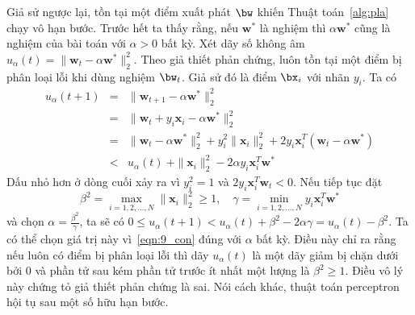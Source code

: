 Giả sử ngược lại, tồn tại một điểm xuất phát $\bw$ khiến Thuật
toán~\ref{alg:pla} chạy vô hạn bước. Trước hết ta thấy rằng, nếu $\mathbf{w}^*$ là nghiệm thì $\alpha\mathbf{w}^*$ cũng là nghiệm của
bài toán với $\alpha > 0$ bất kỳ. Xét dãy số không âm $ u_{\alpha}(t) = \|\mathbf{w}_{t} -
\alpha\mathbf{w}^*\|_2^2$. Theo giả thiết phản chứng, luôn tồn tại một điểm bị phân
loại lỗi khi dùng nghiệm $\bw_t$. Giả sử đó là điểm $\bx_i$ với nhãn $y_i$. Ta
có
\begin{eqnarray} 
\nonumber
    u_{\alpha}(t+1) &=& \|\mathbf{w}_{t+1} - \alpha \mathbf{w}^*\|_2^2 \\\ 
\nonumber
    &=& \|\mathbf{w}_{t} + y_i\mathbf{x}_i - \alpha\mathbf{w}^*\|_2^2 \\\ 
\nonumber
    &=& \|\mathbf{w}_{t} -\alpha\mathbf{w}^*\|_2^2 + y_i^2\|\mathbf{x}_i\|_2^2 + 2y_i\mathbf{x}_i^T(\mathbf{w}_t - \alpha\mathbf{w}^*) \\\ 
    \label{eqn:9_con}
    &<& u_{\alpha}(t) \ + \|\mathbf{x}_i\|_2^2 - 2\alpha y_i\mathbf{x}_i^T \mathbf{w}^* 
\end{eqnarray} 
Dấu nhỏ hơn ở dòng cuối xảy ra vì $y_i^2 = 1$ và $2y_i\mathbf{x}_i^T\mathbf{w}_{t} <
0$. Nếu tiếp tục đặt
\begin{equation*} 
\beta^2 = \max_{i=1, 2, \dots, N}\|\mathbf{x}_i\|_2^2 \geq 1, \quad
\gamma = \min_{i=1, 2, \dots, N} y_i\mathbf{x}_i^T\mathbf{w}^*
\end{equation*} 
và chọn $\alpha = \frac{\beta^2}{\gamma}$, ta sẽ có
\begin{math} 
0 \leq u_{\alpha}(t+1) < u_{\alpha}(t) + \beta^2 - 2\alpha\gamma = u_{\alpha}(t) - \beta^2. 
\end{math} Ta có thể chọn giá trị này vì~\eqref{eqn:9_con} đúng với $\alpha$ bất kỳ. Điều này chỉ ra rằng nếu luôn có điểm bị phân loại lỗi thì dãy $u_{\alpha}(t)$ là một dãy giảm bị chặn dưới bởi 0 và phần tử sau kém phần tử trước ít nhất một lượng là $\beta^2\geq 1$. Điều vô lý này chứng tỏ giả thiết phản chứng là sai. Nói cách khác, thuật toán perceptron hội tụ sau một số hữu hạn bước.  
 





 

